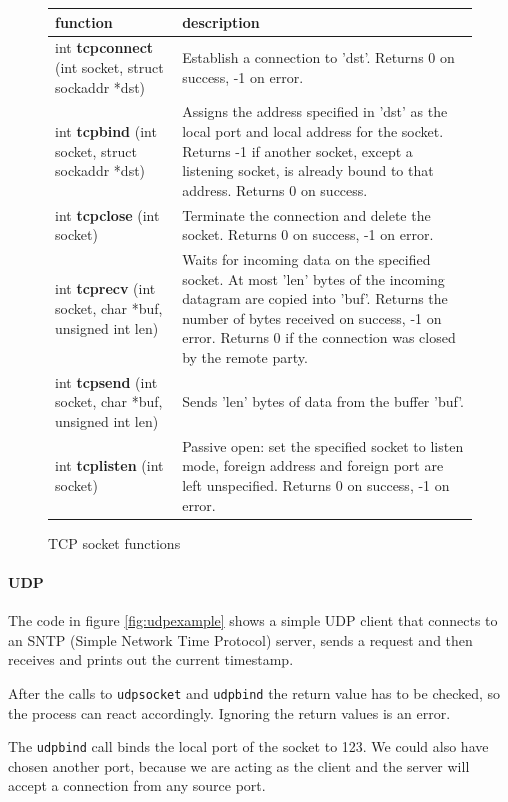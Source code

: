 \documentclass[11pt,twoside,abstract,notitlepage]{scrreprt}
\begin{document}
\begin{figure}[h]
\normalsize
\renewcommand{\arraystretch}{1.2}
\centering
\caption{TCP socket functions}

\label{fig:tcpsockets}
\begin{tabularx}{\textwidth}{X|X}
\textbf{function} & \textbf{description} \\ \hline
int \textbf{tcpconnect} (int socket, struct sockaddr *dst) & Establish a connection to 'dst'. Returns 0 on success, -1 on error. \\ \hline
int \textbf{tcpbind} (int socket, struct sockaddr *dst) & Assigns the address specified in 'dst' as the local port and local address for the socket. Returns -1 if another socket, except a listening socket, is already bound to that address. Returns 0 on success. \\ \hline
int \textbf{tcpclose} (int socket) & Terminate the connection and delete the socket. Returns 0 on success, -1 on error. \\ \hline
int \textbf{tcprecv} (int socket, char *buf, unsigned int len) & Waits for incoming data on the specified socket. At most 'len' bytes of the incoming datagram are copied into 'buf'. Returns the number of bytes received on success, -1 on error. Returns 0 if the connection was closed by the remote party.\\ \hline
int \textbf{tcpsend} (int socket, char *buf, unsigned int len) & Sends 'len' bytes of data from the buffer 'buf'.\\  \hline
int \textbf{tcplisten} (int socket) & Passive open: set the specified socket to listen mode, foreign address and foreign port are left unspecified. Returns 0 on success, -1 on error. \\
\end{tabularx}
\end{figure}

\paragraph{UDP}
The code in figure \ref{fig:udpexample} shows a simple UDP client that connects to an SNTP (Simple Network Time Protocol) server, sends a request and then receives and prints out the current timestamp. 

After the calls to \texttt{udpsocket} and \texttt{udpbind} the return value has to be checked, so the process can react accordingly. Ignoring the return values is an error.

The \texttt{udpbind} call binds the local port of the socket to 123. We could also have chosen another port, because we are acting as the client and the server will accept a connection from any source port. 
\end{document}

